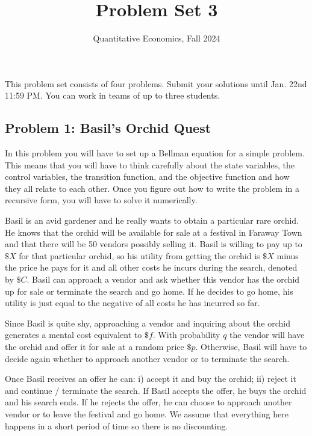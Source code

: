 \documentclass[english,hyperref={pdftex,pdfpagemode=UseNone,hidelinks}]{tufte-handout}
\title{Problem Set 3}
\author{Quantitative Economics, Fall 2024}
\begin{document}
\maketitle
This problem set consists of four problems. Submit your solutions until Jan. 22nd 11:59 PM. You can work in teams of up to three students.   



\subsection*{Problem 1: Basil's Orchid Quest}

In this problem you will have to set up a Bellman equation for a simple problem. This means that you will have to think carefully about the state variables, the control variables, the transition function, and the objective function and how they all relate to each other. Once you figure out how to write the problem in a recursive form, you will have to solve it numerically.

Basil is an avid gardener and he really wants to obtain a particular rare orchid. He knows that the orchid will be available for sale at a festival in Faraway Town and that there will be 50 vendors possibly selling it.  Basil is willing to pay up to $\$ X$ for that particular orchid, so his utility from getting the orchid is $ \$ X$ minus the price he pays for it and all other costs he incurs during the search, denoted by $ \$ C$.  Basil can approach a vendor and ask whether this vendor has the orchid up for sale or terminate the search and go home. If he decides to go home, his utility is just equal to the negative of all costs he has incurred so far.

Since Basil is quite shy, approaching a vendor and inquiring about the orchid generates a mental cost equivalent to  $ \$ f$. With probability $q$ the vendor will have the orchid and offer it for sale at a random price $ \$ p$. Otherwise, Basil will have to decide again whether to approach another vendor or to terminate the search.

Once Basil receives an offer he can: i) accept it and buy the orchid; ii) reject it and continue / terminate the search. If Basil accepts the offer, he buys the orchid and his search ends. If he rejects the offer, he can choose to approach another vendor or to leave the festival and go home. 
We assume that everything here happens in a short period of time so there is no discounting. 
\end{document}
